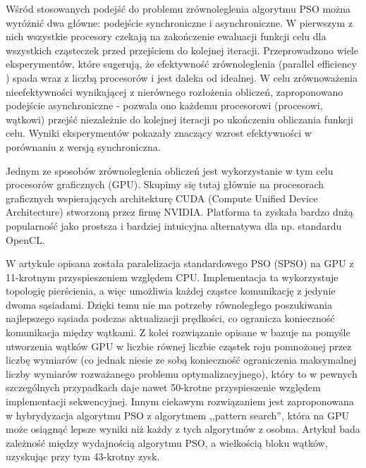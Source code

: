 \documentclass[12pt, twoside, openany, abstract=on]{report}
\theoremstyle{definition}
\begin{document}
Wśród stosowanych podejść do problemu zrównoleglenia algorytmu PSO można wyróżnić dwa główne: podejście synchroniczne i asynchroniczne. W pierwszym z nich wszystkie procesory czekają na zakończenie ewaluacji funkcji celu dla wszystkich cząsteczek przed przejściem do kolejnej iteracji. Przeprowadzono wiele eksperymentów, które sugerują, że efektywność zrównoleglenia (parallel efficiency%
) spada wraz z liczbą procesorów i jest daleka od idealnej.
W celu zrównoważenia nieefektywności wynikającej z nierównego rozłożenia obliczeń, zaproponowano podejście asynchroniczne - pozwala ono każdemu procesorowi (procesowi, wątkowi) przejść niezależnie do kolejnej iteracji po ukończeniu obliczania funkcji celu. Wyniki eksperymentów pokazały znaczący wzrost efektywności w porównaniu z wersją synchroniczna. 

Jednym ze sposobów zrównoleglenia obliczeń jest wykorzystanie w tym celu procesorów graficznych (GPU). Skupimy się tutaj głównie na procesorach graficznych wspierających architekturę CUDA (Compute Unified Device Architecture) \cite{CudaProgGuide} stworzoną przez firmę NVIDIA. Platforma ta zyskała bardzo dużą popularność jako prostsza i bardziej intuicyjna alternatywa dla np. standardu OpenCL.


W artykule \cite{GpuBasedPso} opisana została paralelizacja 
 standardowego PSO (SPSO) na GPU z 11-krotnym przyspieszeniem względem CPU. Implementacja ta wykorzystuje topologię pierścienia, a więc umożliwia każdej cząstce komunikację z jedynie dwoma sąsiadami. Dzięki temu nie ma potrzeby równoległego poszukiwania najlepszego sąsiada podczas aktualizacji prędkości, co ogranicza konieczność komunikacja między wątkami. Z kolei rozwiązanie opisane w \cite{PsoCuda} bazuje na pomyśle utworzenia wątków GPU w liczbie równej liczbie cząstek roju pomnożonej przez liczbę wymiarów (co jednak niesie ze sobą konieczność ograniczenia maksymalnej liczby wymiarów rozważanego problemu optymalizacyjnego), który to w pewnych szczególnych przypadkach daje nawet 50-krotne przyspieszenie względem implementacji sekwencyjnej. Innym ciekawym rozwiązaniem jest zaproponowana w \cite{PsoGraphHardLocPat} hybrydyzacja algorytmu PSO z algorytmem ,,pattern search'', która na GPU może osiągnąć lepsze wyniki niż każdy z tych algorytmów z osobna. 
Artykuł \cite{BlockOccupancyGpu} bada zależność między wydajnością algorytmu PSO, a wielkością bloku wątków, uzyskując przy tym 43-krotny zysk.
\end{document}
